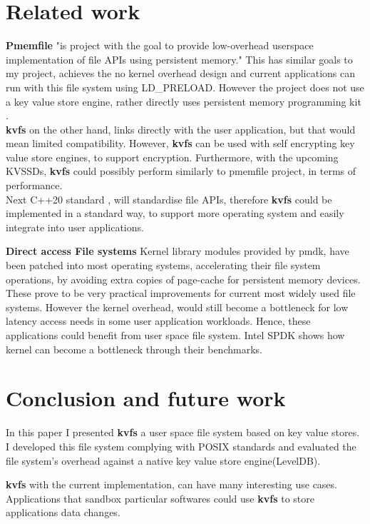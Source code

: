 \documentclass[bsc,frontabs,twoside,singlespacing,parskip,deptreport]{infthesis}     %
\begin{document}
{\chapter{Related work}
\textbf{Pmemfile} \cite{pmemfile} "is project with the goal to provide low-overhead userspace implementation of file APIs using persistent memory." This has similar goals to my project, achieves the no kernel overhead design and current applications can run with this file system using LD\_PRELOAD. However the project does not use a key value store engine, rather directly uses persistent memory programming kit \cite{pmdk}.
\\ {\bf kvfs} on the other hand, links directly with the user application, but that would mean limited compatibility. However, {\bf kvfs} can be used with self encrypting key value store engines, to support encryption. Furthermore, with the upcoming KVSSDs, {\bf kvfs} could possibly perform similarly to pmemfile project, in terms of performance.
\\ Next C++20 standard \cite{std_fs}, will standardise file APIs, therefore {\bf kvfs} could be implemented in a standard way, to support more operating system and easily integrate into user applications.

\textbf{Direct access File systems}
Kernel library modules provided by pmdk\cite{pmdk}, have been patched into most operating systems, accelerating their file system operations, by avoiding extra copies of page-cache for persistent memory devices. These prove to be very practical improvements for current most widely used file systems. However the kernel overhead, would still become a bottleneck for low latency access needs in some user application workloads. Hence, these applications could benefit from user space file system. Intel SPDK\cite{spdk} shows how kernel can become a bottleneck through their benchmarks.

\chapter{Conclusion and future work}
In this paper I presented {\bf kvfs} a user space file system based on key value stores. I developed this file system complying with POSIX standards and evaluated the file system's overhead against a native key value store engine(LevelDB). 

{\bf kvfs} with the current implementation, can have many interesting use cases. Applications that sandbox particular softwares could use {\bf kvfs} to store applications data changes.

}
\end{document}
